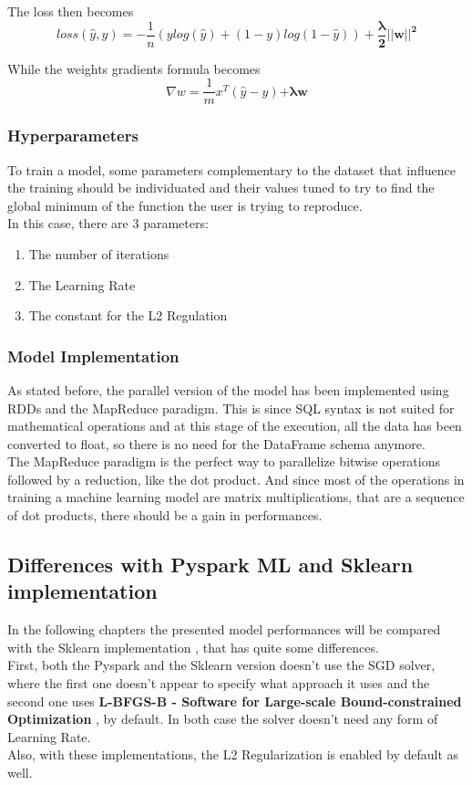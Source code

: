 \documentclass[
	letterpaper, %
	10pt, %
]{class}
\begin{document}
The loss then becomes
$$ loss(\hat{y}, y) = -\frac{1}{n}(y log(\hat{y}) + (1-y)log(1-\hat{y})) + \boldsymbol{\frac{\lambda}{2}||w||^2} $$

While the weights gradients formula becomes
$$ \nabla w = \frac{1}{m}x^T(\hat{y} - y) \boldsymbol{+ \lambda w} $$

\subsubsection{Hyperparameters}
To train a model, some parameters complementary to the dataset that influence the training should be individuated and their values tuned to try to find the global minimum of the function the user is trying to reproduce.\\
In this case, there are 3 parameters:
\begin{enumerate}
    \item The number of iterations
    \item The Learning Rate
    \item The constant for the L2 Regulation
\end{enumerate}

\subsubsection{Model Implementation}
As stated before, the parallel version of the model has been implemented using RDDs and the MapReduce paradigm. This is since SQL syntax is not suited for mathematical operations and at this stage of the execution, all the data has been converted to float, so there is no need for the DataFrame schema anymore.\\
The MapReduce paradigm is the perfect way to parallelize bitwise operations followed by a reduction, like the dot product. And since most of the operations in training a machine learning model are matrix multiplications, that are a sequence of dot products, there should be a gain in performances.

\subsection{Differences with Pyspark ML and Sklearn implementation}

In the following chapters the presented model performances will be compared with the Sklearn implementation \cite{logisticsklearn}, that has quite some differences.\\
First, both the Pyspark and the Sklearn version doesn't use the SGD solver, where the first one doesn't appear to specify what approach it uses and the second one uses \textbf{L-BFGS-B - Software for Large-scale Bound-constrained Optimization} \cite{lbfgsb}, by default.
In both case the solver doesn't need any form of Learning Rate.\\
Also, with these implementations, the L2 Regularization is enabled by default as well.
\end{document}
